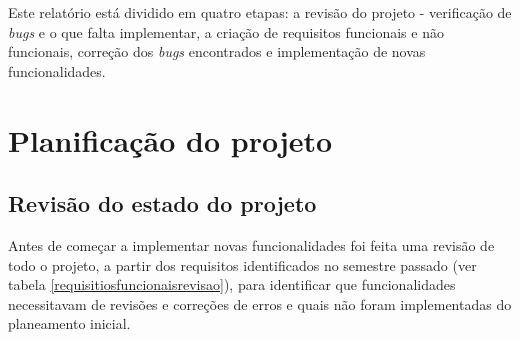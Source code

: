 \documentclass[12pt, twoside]{report}
\begin{document}
	Este relatório está dividido em quatro etapas: a revisão do projeto - verificação de \textit{bugs} e o que falta implementar, a criação de requisitos funcionais e não funcionais, correção dos \textit{bugs} encontrados e implementação de novas funcionalidades.

	
	\chapter{Planificação do projeto}
	\section{Revisão do estado do projeto}
	
		Antes de começar a implementar novas funcionalidades foi feita uma revisão de todo o projeto, a partir dos requisitos identificados no semestre passado (ver tabela \ref{requisitiosfuncionaisrevisao}), para identificar que funcionalidades necessitavam de revisões e correções de erros e quais não foram implementadas do planeamento inicial.
		
\end{document}

